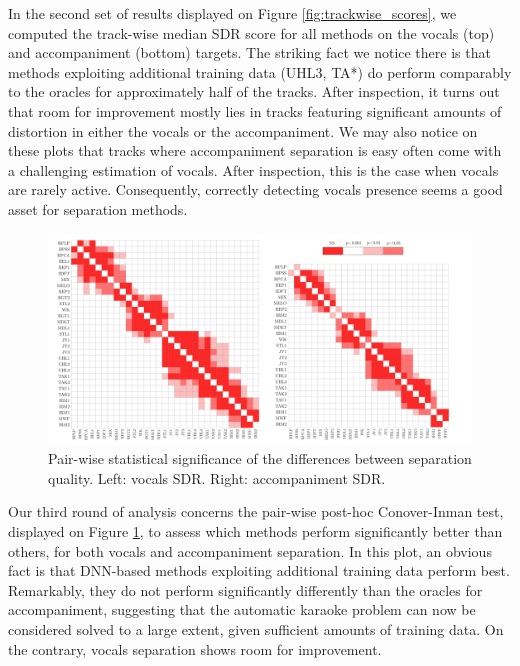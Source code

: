 \documentclass{llncs}
\begin{document}
In the second set of results displayed on Figure \ref{fig:trackwise_scores}, we computed the track-wise median SDR score for all methods on the vocals (top) and accompaniment (bottom) targets. The striking fact we notice there is that methods exploiting additional training data (UHL3, TA*) do perform comparably to the oracles for approximately half of the tracks. After inspection, it turns out that room for improvement mostly lies in tracks featuring significant amounts of distortion in either the vocals or the accompaniment. We may also notice on these plots that tracks where accompaniment separation is easy often come with a challenging estimation of vocals. After inspection, this is the case when vocals are rarely active. Consequently, correctly detecting vocals presence seems a good asset for separation methods.

\begin{figure}[h]
  \begin{center}
     \includegraphics[width=1\linewidth]{fig/pairwise.pdf}
     \vspace{-1cm}
  \end{center}
  \caption{Pair-wise statistical significance of the differences between separation quality. Left: vocals SDR. Right: accompaniment SDR.}
  \label{fig:pairwise_matrix}
\end{figure}

Our third round of analysis concerns the pair-wise post-hoc Conover-Inman test, displayed on Figure \ref{fig:pairwise_matrix}, to assess which methods perform significantly better than others, for both vocals and accompaniment separation. In this plot, an obvious fact is that DNN-based methods exploiting additional training data perform best. Remarkably, they do not perform significantly differently than the oracles for accompaniment, suggesting that the automatic karaoke problem can now be considered solved to a large extent, given sufficient amounts of training data. On the contrary, vocals separation shows room for improvement.
\end{document}
